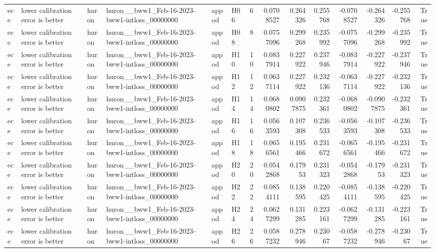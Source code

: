 \begin{longtable}{llllllrrrrrrrr}
ece & lower calibration error is better & huron & huron\_\_bww1\_Feb-16-2023-bww1-intloss\_00000000 & appod & H06 & 6 & 0.0708527 & 0.264326 & 0.255768 & -0.0708527 & -0.264326 & -0.255768 & True \\
ece & lower calibration error is better & huron & huron\_\_bww1\_Feb-16-2023-bww1-intloss\_00000000 & appod & H08 & 8 & 0.0757096 & 0.299268 & 0.235992 & -0.0757096 & -0.299268 & -0.235992 & True \\
ece & lower calibration error is better & huron & huron\_\_bww1\_Feb-16-2023-bww1-intloss\_00000000 & appod & H10 & 10 & 0.0837914 & 0.227922 & 0.237946 & -0.0837914 & -0.227922 & -0.237946 & True \\
ece & lower calibration error is better & huron & huron\_\_bww1\_Feb-16-2023-bww1-intloss\_00000000 & appod & H12 & 12 & 0.0637114 & 0.227922 & 0.232136 & -0.0637114 & -0.227922 & -0.232136 & True \\
ece & lower calibration error is better & huron & huron\_\_bww1\_Feb-16-2023-bww1-intloss\_00000000 & appod & H14 & 14 & 0.0680802 & 0.0907875 & 0.232361 & -0.0680802 & -0.0907875 & -0.232361 & True \\
ece & lower calibration error is better & huron & huron\_\_bww1\_Feb-16-2023-bww1-intloss\_00000000 & appod & H16 & 16 & 0.0563593 & 0.107308 & 0.236533 & -0.0563593 & -0.107308 & -0.236533 & True \\
ece & lower calibration error is better & huron & huron\_\_bww1\_Feb-16-2023-bww1-intloss\_00000000 & appod & H18 & 18 & 0.0656561 & 0.195466 & 0.231672 & -0.0656561 & -0.195466 & -0.231672 & True \\
ece & lower calibration error is better & huron & huron\_\_bww1\_Feb-16-2023-bww1-intloss\_00000000 & appod & H20 & 20 & 0.0542868 & 0.17953 & 0.231323 & -0.0542868 & -0.17953 & -0.231323 & True \\
ece & lower calibration error is better & huron & huron\_\_bww1\_Feb-16-2023-bww1-intloss\_00000000 & appod & H22 & 22 & 0.0854111 & 0.138595 & 0.220425 & -0.0854111 & -0.138595 & -0.220425 & True \\
ece & lower calibration error is better & huron & huron\_\_bww1\_Feb-16-2023-bww1-intloss\_00000000 & appod & H24 & 24 & 0.0627299 & 0.131285 & 0.223161 & -0.0627299 & -0.131285 & -0.223161 & True \\
ece & lower calibration error is better & huron & huron\_\_bww1\_Feb-16-2023-bww1-intloss\_00000000 & appod & H26 & 26 & 0.0587232 & 0.278946 & 0.23067 & -0.0587232 & -0.278946 & -0.23067 & True \\

\end{longtable}
